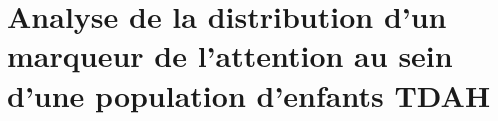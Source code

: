 \chapter{Analyse de la distribution d'un marqueur de l'attention au sein d'une population d'enfants TDAH}

